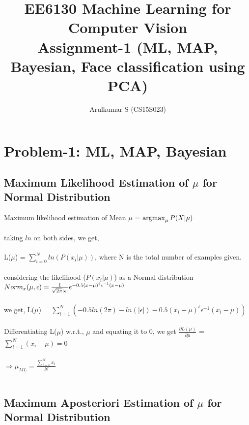 \documentclass[fleqn]{article}
\newcommand{\argmax}{\operatornamewithlimits{argmax}}
\begin{document}
 
\setcounter{secnumdepth}{5}
	\title{EE6130 Machine Learning for Computer Vision \\ Assignment-1 (ML, MAP, Bayesian, Face classification using PCA)}
	\author{ Arulkumar S (CS15S023)}
	\maketitle

\section{Problem-1: ML, MAP, Bayesian}

\subsection{Maximum Likelihood Estimation of $\mu$ for Normal Distribution}
 
Maximum likelihood estimation of Mean $\mu$ = $\argmax_{\mu}{P(X|\mu)}$ \\\\
taking $ln$ on both sides, we get,\\\\
L($\mu$) = $\sum_{i=0}^{N}ln(P(x_i|\mu))$, where N is the total number of examples given.\\\\
considering the likelihood ($P(x_i|\mu)$) as a Normal distribution $Norm_x(\mu, \epsilon) = {{1}\over{\sqrt{2\pi}|\epsilon|}} e^{-0.5(x-\mu)^{t}\epsilon^{-1}(x-\mu)}$ \\\\
we get, L($\mu$) = $\sum_{i=1}^{N}(-0.5ln(2\pi)-ln(|\epsilon|)-0.5(x_i-\mu)^{t}\epsilon^{-1}(x_i-\mu))$\\\\
Differentiating L($\mu$) w.r.t., $\mu$ and equating it to 0, we get $\frac{\partial L(\mu)}{\partial \mu}$ = $\sum_{i=1}^{N}(x_i - \mu) = 0$\\\\ $\Longrightarrow \mu_{ML} = \frac{\sum_{i=0}^{N}x_i}{N}$ \\\\ 

\subsection{Maximum Aposteriori Estimation of $\mu$ for Normal Distribution}
\end{document}
